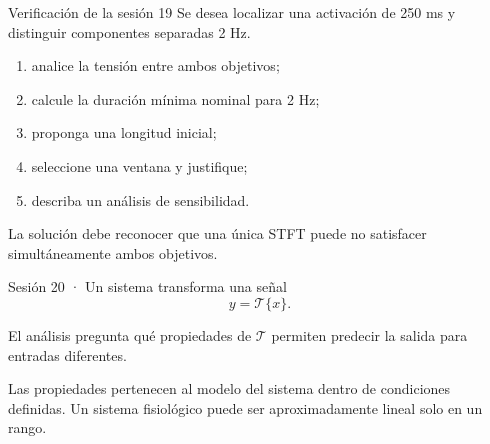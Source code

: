 \documentclass[
  ignorenonframetext,
  aspectratio=169,
  spanish,
]{beamer}
\providecommand{\faExclamation}{\faIcon{exclamation}}
\providecommand{\tightlist}{%
  \setlength{\itemsep}{0pt}\setlength{\parskip}{0pt}}
\begin{document}
\begin{frame}{Verificación de la sesión 19}
  \protect{}\label{verificaciuxf3n-de-la-sesiuxf3n-19}
  Se desea localizar una activación de 250 ms y distinguir componentes
  separadas 2 Hz.

  \begin{enumerate}
    \tightlist
    \item
          analice la tensión entre ambos objetivos;
    \item
          calcule la duración mínima nominal para 2 Hz;
    \item
          proponga una longitud inicial;
    \item
          seleccione una ventana y justifique;
    \item
          describa un análisis de sensibilidad.
  \end{enumerate}

  \begin{tcolorbox}[enhanced jigsaw, arc=.35mm, bottomrule=.15mm, bottomtitle=1mm, breakable, colback=white, colbacktitle=quarto-callout-tip-color!10!white, colframe=quarto-callout-tip-color-frame, coltitle=black, left=2mm, leftrule=.75mm, opacityback=0, opacitybacktitle=0.6, rightrule=.15mm, title=\textcolor{quarto-callout-tip-color}{\faLightbulb}\hspace{0.5em}{Criterio de logro}, titlerule=0mm, toprule=.15mm, toptitle=1mm]

    La solución debe reconocer que una única STFT puede no satisfacer
    simultáneamente ambos objetivos.

  \end{tcolorbox}
\end{frame}

\begin{frame}{Sesión 20 · Un sistema transforma una señal}
  \protect{}\label{sesiuxf3n-20-un-sistema-transforma-una-seuxf1al}
  \[y=\mathcal{T}\{x\}.\]

  El análisis pregunta qué propiedades de \(\mathcal{T}\) permiten
  predecir la salida para entradas diferentes.

  \begin{tcolorbox}[enhanced jigsaw, arc=.35mm, bottomrule=.15mm, bottomtitle=1mm, breakable, colback=white, colbacktitle=quarto-callout-important-color!10!white, colframe=quarto-callout-important-color-frame, coltitle=black, left=2mm, leftrule=.75mm, opacityback=0, opacitybacktitle=0.6, rightrule=.15mm, title=\textcolor{quarto-callout-important-color}{\faExclamation}\hspace{0.5em}{Importante}, titlerule=0mm, toprule=.15mm, toptitle=1mm]

    Las propiedades pertenecen al modelo del sistema dentro de condiciones
    definidas. Un sistema fisiológico puede ser aproximadamente lineal solo
    en un rango.

  \end{tcolorbox}
\end{frame}
\end{document}
